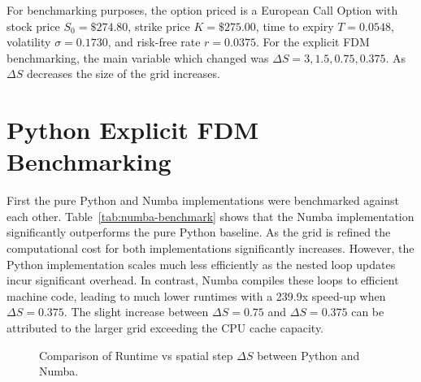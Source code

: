 \documentclass[11pt]{report}
\begin{document}
For benchmarking purposes, the option priced is 
a European Call Option with stock price $S_0 = \$274.80$, 
strike price $K = \$275.00$, time to expiry $T = 0.0548$, 
volatility $\sigma = 0.1730$, and risk-free rate $r = 0.0375$.
For the explicit FDM benchmarking, the main variable which 
changed was $\Delta S = {3, 1.5, 0.75, 0.375}$.
As $\Delta S$ decreases the size of the grid increases.

\section{Python Explicit FDM Benchmarking }\label{sec:PythonBenchmarks}
First the pure Python and Numba implementations were 
benchmarked against each other. 
Table~\ref{tab:numba-benchmark} shows that the Numba 
implementation significantly outperforms the pure 
Python baseline. As the grid is refined the 
computational cost for both implementations 
significantly increases. However, the Python 
implementation scales much less efficiently as 
the nested loop updates incur significant overhead. 
In contrast, Numba compiles these loops to efficient 
machine code, leading to much lower runtimes with a 
239.9x speed-up when $\Delta S=0.375$. The slight 
increase between $\Delta S = 0.75$ and
$\Delta S = 0.375$ can be attributed to the larger 
grid exceeding the CPU cache capacity.
\begin{table}[H]
\centering
{}
\caption{Runtime comparison between Python and Numba implementations of the explicit FDM.}\label{tab:numba-benchmark}
\end{table}
\begin{figure}[H]
  \centering
  
  \caption{Comparison of Runtime vs spatial step $\Delta S$ between Python and Numba.}
  \label{fig:NumbaBenchmark}
\end{figure}
\end{document}
